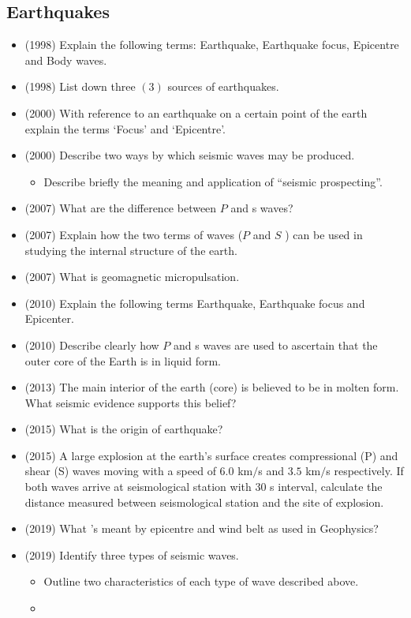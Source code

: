 \documentclass{article}
\begin{document}
\subsection{Earthquakes}
\begin{itemize}
\item (1998)  Explain the following terms: Earthquake, Earthquake focus, Epicentre and Body waves.
\item (1998)  List down three $ (3)$ sources of earthquakes.
\item (2000)  With reference to an earthquake on a certain point of the earth explain the terms ‘Focus’ and ‘Epicentre’.
\item (2000)  Describe two ways by which seismic waves may be produced.\begin{itemize}
\item Describe briefly the meaning and application of “seismic prospecting”. 
\end{itemize}
\item (2007)  What are the difference between $ P$ and s waves?
\item (2007)  Explain how the two terms of waves ($ P$ and $ S$ ) can be used in studying the internal structure of the earth. 
\item (2007)  What is geomagnetic micropulsation.
\item (2010)  Explain the following terms Earthquake, Earthquake focus and Epicenter.
\item (2010)  Describe clearly how $ P$ and s waves are used to ascertain that the outer core of the Earth is in liquid form. 
\item (2013)  The main interior of the earth (core) is believed to be in molten form. What seismic evidence supports this belief?
\item (2015)  What is the origin of earthquake?
\item (2015)  A large explosion at the earth's surface creates compressional (P) and shear (S) waves moving with a speed of $ 6.0$ km$/$s and $ 3.5$ km$/$s respectively. If both waves arrive at seismological station with $ 30$ s interval, calculate the distance measured between seismological station and the site of explosion. 
\item (2019)  What 's meant by epicentre and wind belt as used in Geophysics? 
\item (2019)  Identify three types of seismic waves.\begin{itemize}
\item Outline two characteristics of each type of wave described above.
\item 
\end{itemize}
\end{itemize}
\end{document}
